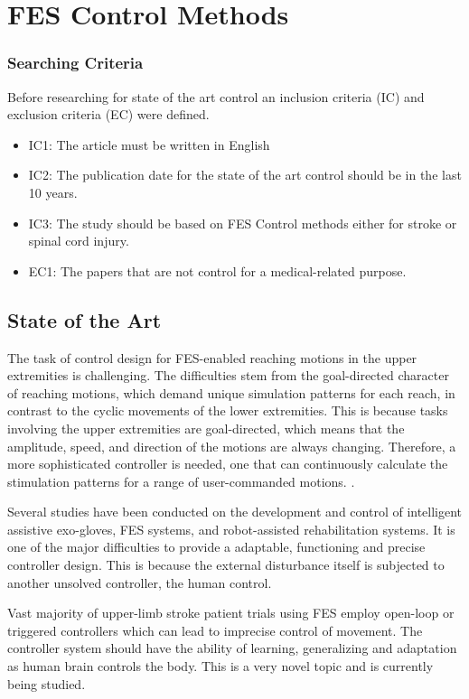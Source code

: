 \newpage
\section{FES Control Methods}
\subsubsection{Searching Criteria}
Before researching for state of the art control an inclusion criteria (IC) and exclusion criteria (EC) were defined.
\begin{itemize}
    \item IC1: The article must be written in English
    \item IC2: The publication date for the state of the art control should be in the last 10 years.
    \item IC3: The study should be based on FES Control methods either for stroke or spinal cord injury.
    \item EC1: The papers that are not control for a medical-related purpose.
\end{itemize}
\subsection{State of the Art}
The task of control design for FES-enabled reaching motions in the upper extremities is challenging. The difficulties stem from the goal-directed character of reaching motions, which demand unique simulation patterns for each reach, in contrast to the cyclic movements of the lower extremities. This is because tasks involving the upper extremities are goal-directed, which means that the amplitude, speed, and direction of the motions are always changing. Therefore, a more sophisticated controller is needed, one that can continuously calculate the stimulation patterns for a range of user-commanded motions. \cite{CFF}.

Several studies have been conducted on the development and control of intelligent assistive exo-gloves, FES systems, and robot-assisted rehabilitation systems. It is one of the major difficulties to provide a adaptable, functioning and precise controller design. This is because the external disturbance itself is subjected to another unsolved controller, the human control. 

Vast majority of upper-limb stroke patient trials using FES employ open-loop or triggered controllers which can lead to imprecise control of movement. The controller system should have the ability of learning, generalizing and adaptation as human brain controls the body. This is a very novel topic and is currently being studied.

